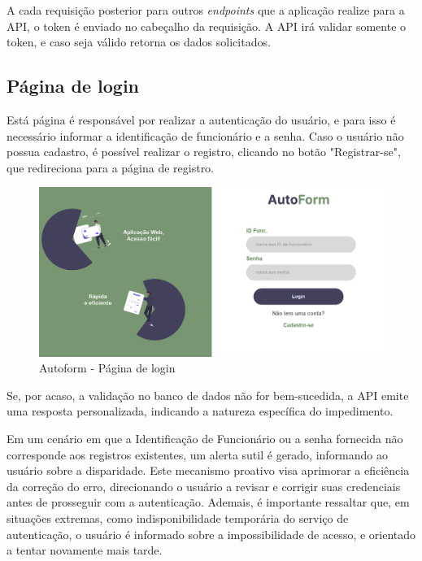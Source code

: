 A cada requisição posterior para outros \textit{endpoints} que a aplicação realize para a API, o token é enviado no cabeçalho da requisição. A API irá validar somente o token, e caso seja válido retorna os dados solicitados.

\subsection{Página de login}
Está página é responsável por realizar a autenticação do usuário, e para isso é necessário informar a identificação de funcionário e a senha. Caso o usuário não possua cadastro, é possível realizar o registro, clicando no botão "Registrar-se", que redireciona para a página de registro.

\begin{figure}[htb]
    \caption{\label{fig:tela-login}Autoform - Página de login}
    \begin{center}
        \includegraphics[scale=0.45]{imagens/login-autoform.png}
    \end{center}
\end{figure}

 Se, por acaso, a validação no banco de dados não for bem-sucedida, a API emite uma resposta personalizada, indicando a natureza específica do impedimento.

Em um cenário em que a Identificação de Funcionário ou a senha fornecida não corresponde aos registros existentes, um alerta sutil é gerado, informando ao usuário sobre a disparidade. Este mecanismo proativo visa aprimorar a eficiência da correção do erro, direcionando o usuário a revisar e corrigir suas credenciais antes de prosseguir com a autenticação.
Ademais, é importante ressaltar que, em situações extremas, como indisponibilidade temporária do serviço de autenticação, o usuário é informado sobre a impossibilidade de acesso, e orientado a tentar novamente mais tarde.


